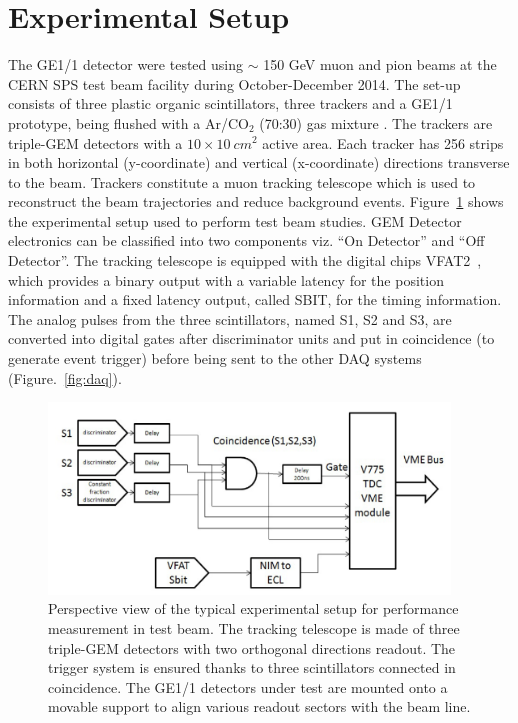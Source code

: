 \section{Experimental Setup}
The GE1/1 detector were tested using $\sim$ 150 GeV muon and pion beams at the CERN SPS test beam facility during October-December 2014. 
The set-up consists of three plastic organic scintillators, three trackers and a GE1/1 prototype, being flushed with a Ar/CO$_{2}$ (70:30) gas mixture . The trackers are triple-GEM detectors with a $10\times10~cm^2$ active area. Each tracker has 256 strips in both horizontal (y-coordinate) and vertical (x-coordinate) directions transverse to the beam. Trackers constitute a muon tracking telescope which is used to reconstruct the beam trajectories and reduce background events. Figure~\ref{fig:tbs} shows the experimental setup used to perform test beam studies.
GEM Detector electronics can be classified into two components viz. ``On Detector'' and ``Off Detector''.
The tracking telescope is equipped with the digital chips VFAT2~\cite{Aspell:2008zz}, which provides a binary output with a variable latency for the position information and a fixed latency output, called SBIT, for the timing information.
The analog pulses from the three scintillators, named S1, S2 and S3, are converted into digital gates after discriminator units and put in coincidence (to generate event trigger) before being sent to the other DAQ systems (Figure.~\ref{fig:daq}).
\begin{figure}[!htbp]
\centering
\includegraphics[width=0.95\textwidth]{figures/GEM/daq.png}
\caption{Perspective view of the typical experimental setup for performance measurement in test beam. The tracking telescope is made of three triple-GEM detectors with two orthogonal directions readout. The trigger system is ensured thanks to three scintillators connected in coincidence. The GE1/1 detectors under test are mounted onto a movable support to align various readout sectors with the beam line.}\label{fig:tbs}
\end{figure}

